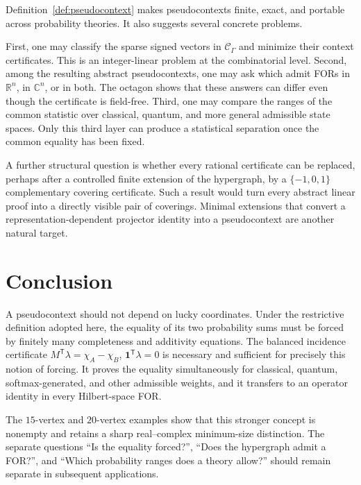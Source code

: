 \documentclass[
  twocolumn,
  aps,
  pra,
  floatfix,
  amsmath,amssymb,
  longbibliography
]{revtex4-2}
\theoremstyle{definition}
\theoremstyle{remark}
\newcommand{\R}{\mathbb R}
\newcommand{\C}{\mathbb C}
\newcommand{\one}{\mathbf 1}
\begin{document}
Definition~\ref{def:pseudocontext} makes pseudocontexts finite, exact, and portable across
probability theories.  It also suggests several concrete problems.

First, one may classify the sparse signed vectors in
$\mathcal C_\Gamma$ and minimize their context certificates.  This is an
integer-linear problem at the combinatorial level.  Second, among the
resulting abstract pseudocontexts, one may ask which admit FORs in $\R^n$,
in $\C^n$, or in both.  The octagon shows that
these answers can differ even though the certificate is field-free.  Third,
one may compare the ranges of the common statistic over classical,
quantum, and more general admissible state spaces.  Only this third layer can
produce a statistical separation once the common equality has been fixed.

A further structural question is whether every rational certificate can be
replaced, perhaps after a controlled finite extension of the hypergraph, by a
$\{-1,0,1\}$ complementary covering certificate.  Such a result would turn
every abstract linear proof into a directly visible pair of coverings.
Minimal extensions that convert a representation-dependent projector
identity into a pseudocontext are another natural target.

\section{Conclusion}

A pseudocontext should not depend on lucky coordinates.  Under the
restrictive definition adopted here, the equality of its two probability
sums must be forced by finitely many completeness and additivity equations.
The balanced incidence certificate
$M^{\mathsf T}\lambda=\chi_A-\chi_B$,
$\one^{\mathsf T}\lambda=0$ is necessary and sufficient for precisely this
notion of forcing.  It proves the equality simultaneously for classical,
quantum, softmax-generated, and other admissible weights, and it transfers to
an operator identity in every Hilbert-space FOR.

The $15$-vertex and $20$-vertex examples show that this stronger concept is
nonempty and retains a sharp real--complex minimum-size distinction.  The
separate questions ``Is the equality forced?'', ``Does the hypergraph admit
a FOR?'', and ``Which probability ranges does a theory
allow?'' should remain separate in subsequent applications.
\end{document}
